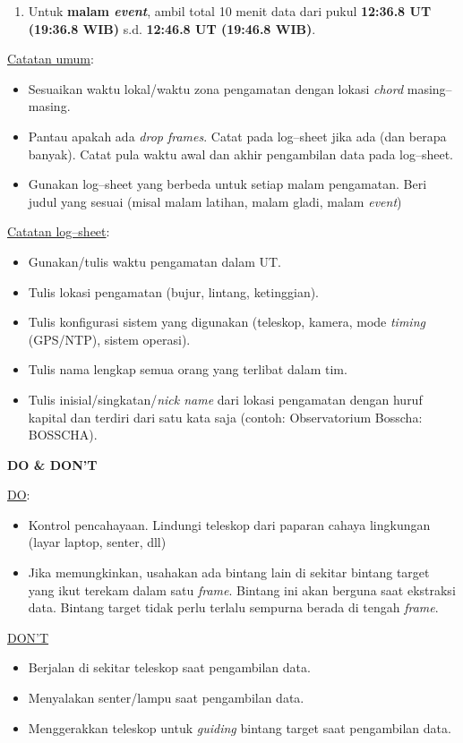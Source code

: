 \documentclass[12pt,a4paper]{article}
\begin{document}
\begin{enumerate}
\begin{enumerate}
		Kesempatan ini digunakan untuk finalisasi konfigurasi instrumen dan \textit{setting} kamera. Konfigurasi terbaik dari sesi ini akan dipertahankan untuk digunakan pada malam \textit{event}.
		\item Untuk \textbf{malam \textit{event}}, ambil total 10 menit data dari pukul \textbf{12:36.8 UT (19:36.8 WIB)} s.d. \textbf{12:46.8 UT (19:46.8 WIB)}. 
	\end{enumerate}
	\underline{Catatan umum}: 
	\begin{itemize}
		\item Sesuaikan waktu lokal/waktu zona pengamatan dengan lokasi \textit{chord} masing--masing.
		\item Pantau apakah ada \textit{drop frames}. Catat pada log--sheet jika ada (dan berapa banyak). Catat pula waktu awal dan akhir pengambilan data pada log--sheet.
		\item Gunakan log--sheet yang berbeda untuk setiap malam pengamatan. Beri judul yang sesuai (misal malam latihan, malam gladi, malam \textit{event})
	\end{itemize}
	\underline{Catatan log--sheet}:
	\begin{itemize}
		\item Gunakan/tulis waktu pengamatan dalam UT.
		\item Tulis lokasi pengamatan (bujur, lintang, ketinggian).
		\item Tulis konfigurasi sistem yang digunakan (teleskop, kamera, mode \textit{timing} (GPS/NTP), sistem operasi).
		\item Tulis nama lengkap semua orang yang terlibat dalam tim.
		\item Tulis inisial/singkatan/\textit{nick name} dari lokasi pengamatan dengan huruf kapital dan terdiri dari satu kata saja (contoh: Observatorium Bosscha: BOSSCHA).
	\end{itemize}
	\textbf{DO \& DON'T}
	
	\underline{DO}:
	\begin{itemize}
		\item Kontrol pencahayaan. Lindungi teleskop dari paparan cahaya lingkungan (layar laptop, senter, dll)
		\item Jika memungkinkan, usahakan ada bintang lain di sekitar bintang target yang ikut terekam dalam satu \textit{frame}. Bintang ini akan berguna saat ekstraksi data. Bintang target tidak perlu terlalu sempurna berada di tengah \textit{frame}.
	\end{itemize}
	\underline{DON'T}
	\begin{itemize}
		\item Berjalan di sekitar teleskop saat pengambilan data.
		\item Menyalakan senter/lampu saat pengambilan data.
		\item Menggerakkan teleskop untuk \textit{guiding} bintang target saat pengambilan data. 		
	\end{itemize} 
\end{enumerate}
\end{document}
